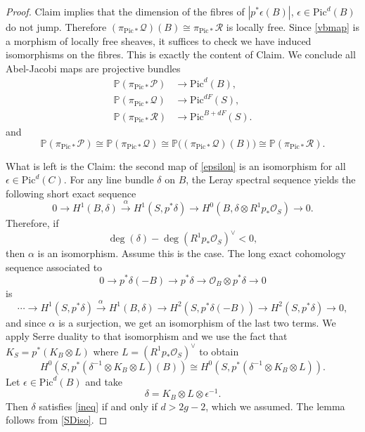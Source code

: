 \documentclass{amsart}
\theoremstyle{definition}
\newcommand{\PP} {\mathbb{P}}
\renewcommand{\O}{\mathcal{O}}
\newcommand{\Pic}{\mathrm{Pic}}
\newcommand{\rt}[1]{\stackrel{#1\,}{\rightarrow}}
\newcommand{\cQ}{\mathcal{Q}}
\newcommand{\cR}{\mathcal{R}}
\begin{document}
\begin{proof}
Claim implies that the dimension of the fibres of $|p^* \epsilon(B)|$, $\epsilon \in \Pic^d(B)$ do not jump. Therefore $(\pi_{\Pic *} \cQ)(B) \cong \pi_{\Pic *} \cR$ is locally free. Since \eqref{vbmap} is a morphism of locally free sheaves, it suffices to check we have induced isomorphisms on the fibres. This is exactly the content of Claim. We conclude all Abel-Jacobi maps are projective bundles 
\begin{align*}
\PP(\pi_{\Pic *} \mathcal{P}) &\rightarrow \Pic^d(B), \\
\PP(\pi_{\Pic *} \mathcal{Q}) &\rightarrow \Pic^{dF}(S), \\
\PP(\pi_{\Pic *} \mathcal{R}) &\rightarrow \Pic^{B+dF}(S).
\end{align*}
and 
$$
\PP(\pi_{\Pic *} \mathcal{P}) \cong \PP(\pi_{\Pic *} \mathcal{Q}) \cong \PP\big((\pi_{\Pic *} \mathcal{Q})(B)\big) \cong \PP(\pi_{\Pic *} \mathcal{R}).
$$

What is left is the Claim: the second map of \eqref{epsilon} is an isomorphism for all $\epsilon \in \Pic^d(C)$. For any line bundle $\delta$ on $B$, the Leray spectral sequence yields the following short exact sequence
\[
0\to H^{1} (B,\delta ) \stackrel{\alpha}{\longrightarrow} H^{1} (S,p^{*}\delta ) \longrightarrow H^{0} (B,\delta \otimes R^{1}p _{*}\O_S ) \to 0.
\]
Therefore, if
\begin{equation} \label{ineq}
\deg( \delta) - \deg (R^1 p_* \O_S)^\vee < 0,
\end{equation}
then $\alpha$ is an isomorphism. Assume this is the case. The long exact cohomology sequence associated to 
\[
0\to p^{*}\delta (-B)\to p^{*}\delta \to \O _{B}\otimes p^{*}\delta \to 0
\]
is
\[
\dotsb \to H^{1} (S,p ^{*} \delta )\rt{\alpha }H^{1} (B,\delta )\to H^{2} (S,p ^{*}\delta (-B))\to H^{2} (S,p ^{*}\delta )\to 0,
\]
and since $\alpha $ is a surjection, we get an isomorphism of the last
two terms. We apply Serre duality to that isomorphism and we use the
fact that $K_{S} = p ^{*} (K_{B}\otimes L)$ where $L = \left(R^1 p
_{*}\O _{S} \right)^{\vee }$ \cite[Thm.~12.1]{BPV} to obtain
\begin{equation} \label{SDiso}
H^{0} (S,p ^{*} (\delta ^{-1}\otimes K_{B}\otimes L) (B)) \cong H^{0}(S,p ^{*} (\delta ^{-1}\otimes K_{B}\otimes L)).
\end{equation}
Let $\epsilon \in \Pic^d(B)$ and take
$$
\delta =K_{B}\otimes L\otimes \epsilon ^{-1}.
$$
Then $\delta$ satisfies \eqref{ineq} if and only if $d>2g-2$, which we assumed. The lemma follows from \eqref{SDiso}.
\end{proof}
\end{document}
